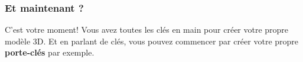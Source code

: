 \subsubsection{Et maintenant ?}

C'est votre moment!
Vous avez toutes les clés en main pour créer votre propre modèle 3D.
Et en parlant de clés, vous pouvez commencer par créer votre propre \textbf{porte-clés} par exemple.

